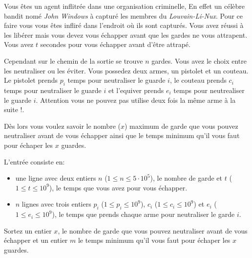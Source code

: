 \problemname{\problemyamlname}


Vous êtes un agent inflitrée dans une organisation criminelle, En effet un célèbre bandit nomé \textit{John Windows} à capturé les membres du \textit{Louvain-Li-Nux}. Pour ce faire vous vous êtes infliré dans l'endroit où ils sont capturés. Vous avez réussi à les libérer mais vous devez vous échapper avant que les gardes ne vous attrapent.  Vous avez $t$ secondes pour vous échapper avant d'être attrapé.

Cependant sur le chemin de la sortie se trouve $n$ gardes. Vous avez le choix entre les neutraliser ou les éviter. Vous possedez deux armes, un pistolet et un couteau. Le pistolet prends $p_i$ temps pour neutraliser le guarde $i$, le couteau prends $c_i$ temps pour neutraliser le guarde $i$ et l'equiver prends $e_i$ temps pour neutrealiser le guarde $i$. Attention vous ne pouvez pas utilise deux fois la même arme à la suite !.

Dès lors vous voulez savoir le nombre ($x$) maximum de garde que vous pouvez neutraliser avant de vous échapper ainsi que le temps minimum qu'il vous faut pour échaper les $x$ guardes.
\begin{Input}
    L'entrée consiste en:
    \begin{itemize}
        \item une ligne avec deux entiers $n$ ($1\leq n \leq 5 \cdot 10^5$), le nombre de garde et $t$ ($1\leq t \leq 10^9$), le temps que vous avez pour vous échapper.
        \item $n$ lignes avec trois entiers  $p_i$ ($1\leq p_i \leq 10^9$), $c_i$ ($1\leq c_i \leq 10^9$) et $e_i$ ($1\leq e_i \leq 10^9$), le temps que prends chaque arme pour neutraliser le garde $i$.
    \end{itemize}
\end{Input}

\begin{Output}
    Sortez un entier $x$, le nombre de garde que vous pouvez neutraliser avant de vous échapper et un entier $m$ le temps minimum qu'il vous faut pour échaper les $x$ guardes.
\end{Output}
